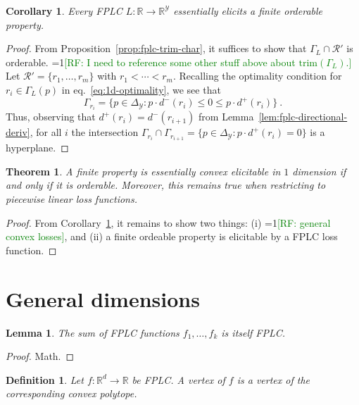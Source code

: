\documentclass[11pt]{article}
\newcommand{\Comments}{1}
\newcommand{\mynote}[2]{\ifnum\Comments=1\textcolor{#1}{#2}\fi}
\newcommand{\raf}[1]{\mynote{green}{[RF: #1]}}
\newcommand{\reals}{\mathbb{R}}
\newcommand{\R}{\mathcal{R}}
\newcommand{\Y}{\mathcal{Y}}
\newcommand{\trim}{\mathrm{trim}}
\newtheorem{theorem}{Theorem}
\newtheorem{lemma}{Lemma}
\newtheorem{definition}{Definition}
\newtheorem{corollary}{Corollary}
\begin{document}
\begin{corollary}\label{cor:fplc-orderable}
  Every FPLC $L : \reals \to \reals^\Y$ essentially elicits a finite orderable property.
\end{corollary}
\begin{proof}
  From Proposition~\ref{prop:fplc-trim-char}, it suffices to show that $\Gamma_L\cap\R'$ is orderable.
  \raf{I need to reference some other stuff above about $\trim(\Gamma_L)$.}
  Let $\R' = \{r_1,\ldots,r_m\}$ with $r_1 < \cdots < r_m$.
  Recalling the optimality condition for $r_i \in \Gamma_L(p)$ in eq.~\eqref{eq:1d-optimality}, we see that
  \begin{equation*}\label{eq:fplc-level-set}
    \Gamma_{r_i} = \{ p \in \Delta_\Y : p\cdot d^-(r_i) \leq 0 \leq p\cdot d^+(r_{i}) \}~.
  \end{equation*}
  Thus, observing that $d^+(r_i) = d^-(r_{i+1})$ from Lemma~\ref{lem:fplc-directional-deriv}, for all $i$ the intersection $\Gamma_{r_i} \cap \Gamma_{r_{i+1}} = \{ p \in \Delta_\Y : p\cdot d^+(r_i) = 0\}$ is a hyperplane.
\end{proof}


\begin{theorem}\label{thm:fplc-orderable}
  A finite property is essentially convex elicitable in $1$ dimension if and only if it is orderable.
  Moreover, this remains true when restricting to piecewise linear loss functions.
\end{theorem}
\begin{proof}
  From Corollary~\ref{cor:fplc-orderable}, it remains to show two things: (i) \raf{general convex losses}, and (ii) a finite ordeable property is elicitable by a FPLC loss function.  
\end{proof}


\section{General dimensions}

\begin{lemma}\label{lem:sum-fplc}
  The sum of FPLC functions $f_1,\ldots,f_k$ is itself FPLC.
\end{lemma}
\begin{proof}
  Math.
\end{proof}

\begin{definition}
  Let $f:\reals^d\to\reals$ be FPLC.
  A \emph{vertex} of $f$ is a vertex of the corresponding convex polytope.
\end{definition}
\end{document}
